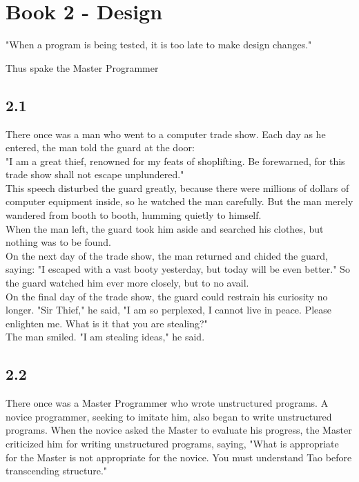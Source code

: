 \documentclass[14pt, letterpaper]{book}
\begin{document}
\chapter*{Book 2 - Design}
\epigraph{"When a program is being tested, it is too late to make design changes."}{Thus spake the Master Programmer}

\section*{2.1}
There once was a man who went to a computer trade show. Each day as he entered, the man told the guard at the door:\\

"I am a great thief, renowned for my feats of shoplifting. Be forewarned, for this trade show shall not escape unplundered."\\

This speech disturbed the guard greatly, because there were millions of dollars of computer equipment inside, so he watched the man carefully. But the man merely wandered from booth to booth, humming quietly to himself.\\

When the man left, the guard took him aside and searched his clothes, but nothing was to be found.\\

On the next day of the trade show, the man returned and chided the guard, saying: "I escaped with a vast booty yesterday, but today will be even better." So the guard watched him ever more closely, but to no avail.\\

On the final day of the trade show, the guard could restrain his curiosity no longer. "Sir Thief," he said, "I am so perplexed, I cannot live in peace. Please enlighten me. What is it that you are stealing?"\\

The man smiled. "I am stealing ideas," he said.\\

\section*{2.2}
There once was a Master Programmer who wrote unstructured programs. A novice programmer, seeking to imitate him, also began to write unstructured programs. When the novice asked the Master to evaluate his progress, the Master criticized him for writing unstructured programs, saying, "What is appropriate for the Master is not appropriate for the novice. You must understand Tao before transcending structure."
\end{document}
